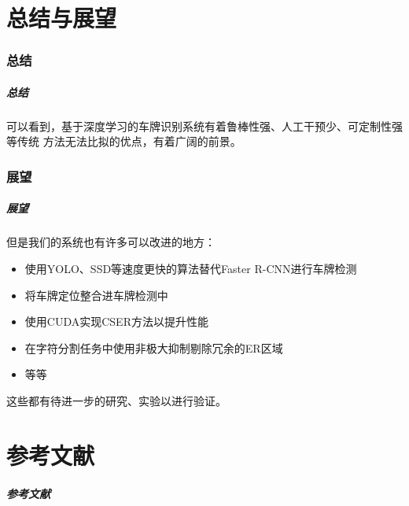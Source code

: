 \documentclass[UTF8]{beamer}
\begin{document}
\part{总结与展望}

\section{总结}

\begin{frame}
  \frametitle{总结}

  可以看到，基于深度学习的车牌识别系统有着鲁棒性强、人工干预少、可定制性强等传统
  方法无法比拟的优点，有着广阔的前景。
\end{frame}

\section{展望}

\begin{frame}
  \frametitle{展望}

  但是我们的系统也有许多可以改进的地方：
  \begin{itemize}
    \item 使用YOLO\cite{Redmon:2015tl}、SSD\cite{Liu:2015wa}等速度更快的算法替代Faster R-CNN进行车牌检测
    \item 将车牌定位整合进车牌检测中
    \item 使用CUDA实现CSER方法以提升性能
    \item 在字符分割任务中使用非极大抑制剔除冗余的ER区域
    \item 等等
    \end{itemize}
  这些都有待进一步的研究、实验以进行验证。
\end{frame}    

\part{参考文献}

\begin{frame}[t, allowframebreaks]
  \frametitle{参考文献}
  \printbibliography
\end{frame}

{ \xdbg
\begin{frame}
\end{frame}
}
\end{document}
